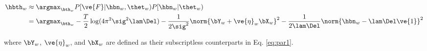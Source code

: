 \begin{subequations}
\begin{align} \label{eq:w_par}
\hbth_w &\approx \argmax_{\bth_w}P[\ve{F}| \hbn_w, \thet_w) P[\hbn_w | \thet_w) \\
&= \argmax_{\bth_w} -\frac{T}{2} \log (4\pi^2\sig^2\lam\Del) - \frac{1}{2\sig^2} \norm{\bY_w + \ve{\eta}_w \bX_w}^2 - \frac{1}{2\lam\Del} \norm{\hbn_w - \lam\Del\ve{1}}^2
\end{align}
\end{subequations}

\noindent where $\bY_w$, $\ve{\eta}_w$, and $\bX_w$ are defined as their subscriptless counterparts in Eq. \eqref{eq:par1}.


